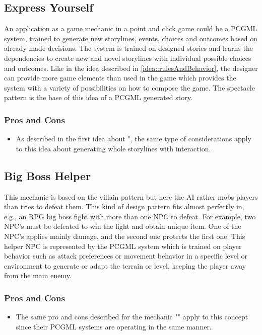 \documentclass[MGS,Master,english]{twbook}%
\begin{document}
\subsection{Express Yourself} \label{idea::expressYourself}
An application as a game mechanic in a point and click game could be a \ac{PCGML} system, trained to generate new storylines, events, choices and outcomes based on already made decisions. The system is trained on designed stories and learns the dependencies to create new and novel storylines with individual possible choices and outcomes. Like in the idea described in \ref{idea::rulesAndBehavior}, the designer can provide more game elements than used in the game which provides the system with a variety of possibilities on how to compose the game. The spectacle pattern is the base of this idea of a \ac{PCGML} generated story.

\subsubsection{Pros and Cons}
\begin{itemize}
	\item As described in the first idea about ", the same type of considerations apply to this idea about generating whole storylines with interaction.
\end{itemize}

\subsection{Big Boss Helper} \label{idea::bigBossHelper}
This mechanic is based on the villain pattern but here the \ac{AI} rather mobs players than tries to defeat them. This kind of design pattern fits almost perfectly in, e.g., an \ac{RPG} big boss fight with more than one \ac{NPC} to defeat. For example, two \ac{NPC}’s must be defeated to win the fight and obtain unique item. One of the \ac{NPC}'s applies mainly damage, and the second one protects the first one. This helper \ac{NPC} is represented by the \ac{PCGML} system which is trained on player behavior such as attack preferences or movement behavior in a specific level or environment to generate or adapt the terrain or level, keeping the player away from the main enemy.

\subsubsection{Pros and Cons}
\begin{itemize}
	\item The same pro and cons described for the mechanic "" apply to this concept since their \ac{PCGML} systems are operating in the same manner.
\end{itemize}
\end{document}

